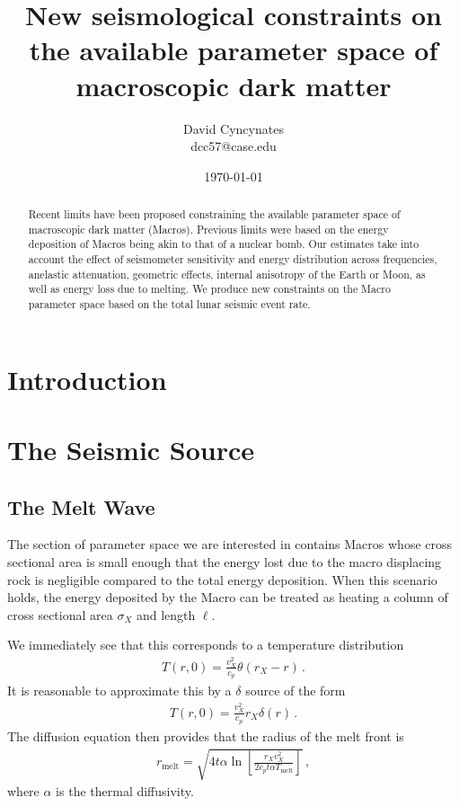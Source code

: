 \documentclass[prd,reprint,10pt,tightenlines]{revtex4-1}
\newcommand*\te[1]{\text{#1}}
\newcommand*\ps[1]{\left[#1\right]}
\newcommand*\f[2]{\frac{#1}{#2}}
\begin{document}
\title{New seismological constraints on the available parameter space of macroscopic dark matter}
\author{David Cyncynates \\ dcc57@case.edu}
\date{\today}
\begin{abstract}
Recent limits have been proposed constraining the available parameter space of macroscopic dark matter (Macros). Previous limits were based on the energy deposition of Macros being akin to that of a nuclear bomb. Our estimates take into account the effect of seismometer sensitivity and energy distribution across frequencies, anelastic attenuation, geometric effects, internal anisotropy of the Earth or Moon, as well as energy loss due to melting. We produce new constraints on the Macro parameter space based on the total lunar seismic event rate.
\end{abstract}
\maketitle
\section{Introduction}

\section{The Seismic Source}
\subsection{The Melt Wave}
The section of parameter space we are interested in contains Macros whose cross sectional area is small enough that the energy lost due to the macro displacing rock is negligible compared to the total energy deposition. When this scenario holds, the energy deposited by the Macro can be treated as heating a column of cross sectional area $\sigma_X$ and length $\ell$.

We immediately see that this corresponds to a temperature distribution
\begin{align}
T(r,0) = \f{v_X^2}{c_p}\theta(r_X-r)\,.
\end{align}
It is reasonable to approximate this by a $\delta$ source of the form
\begin{align}
T(r,0) = \f{v_X^2}{c_p}r_X\delta(r)\,.
\end{align}
The diffusion equation then provides that the radius of the melt front is
\begin{align}
r_\te{melt}= \sqrt{4t\alpha\ln\ps{\f{r_X v_X^2}{2 c_p t \alpha T_\te{melt}}}}\,,
\end{align}
where $\alpha$ is the thermal diffusivity. 
\end{document}
